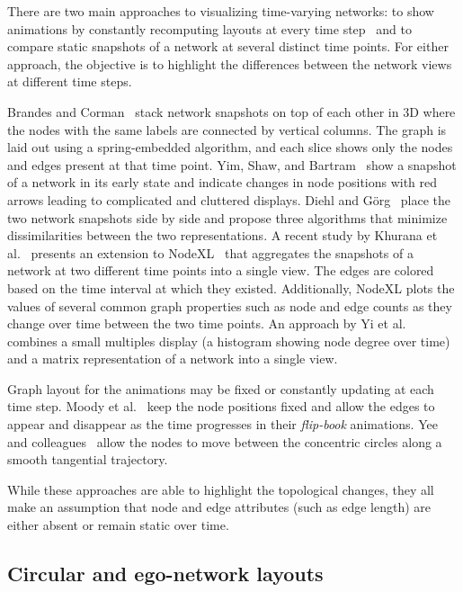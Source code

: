 \documentclass[12pt]{cmuthesis}
\begin{document}
  There are two main approaches to visualizing time-varying networks: to show animations by constantly recomputing layouts at every time step~\cite{Yee2001} and to compare static snapshots of a network at several distinct time points. For either approach, the objective is to highlight the differences between the network views at different time steps.

  Brandes and Corman~\cite{Brandes2003a} stack network snapshots on top of each other in 3D where the nodes with the same labels are connected by vertical columns. The graph is laid out using a spring-embedded algorithm, and each slice shows only the nodes and edges present at that time point. Yim, Shaw, and Bartram~\cite{Yim2009} show a snapshot of a network in its early state and indicate changes in node positions with red arrows leading to complicated and cluttered displays. Diehl and G\"{o}rg~\cite{Diehl2002} place the two network snapshots side by side and propose three algorithms that minimize dissimilarities between the two representations. A recent study by Khurana et al.~\cite{Khurana2011} presents an extension to NodeXL~\cite{Bonsignore2009} that aggregates the snapshots of a network at two different time points into a single view. The edges are colored based on the time interval at which they existed. Additionally, NodeXL plots the values of several common graph properties such as node and edge counts as they change over time between the two time points. An approach by Yi et al.~\cite{Yi2010} combines a small multiples display (a histogram showing node degree over time) and a matrix representation of a network into a single view.

  Graph layout for the animations may be fixed or constantly updating at each time step. Moody et al.~\cite{Moody2005} keep the node positions fixed and allow the edges to appear and disappear as the time progresses in their \emph{flip-book} animations. Yee and colleagues~\cite{Yee2001} allow the nodes to move between the concentric circles along a smooth tangential trajectory.

  While these approaches are able to highlight the topological changes, they all make an assumption that node and edge attributes (such as edge length) are either absent or remain static over time.


  \subsection{Circular and ego-network layouts}
\end{document}
